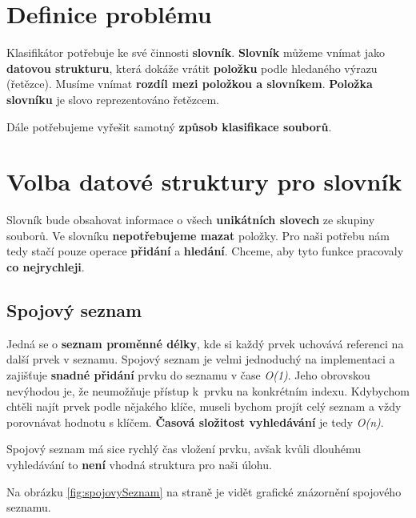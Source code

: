 \documentclass[12pt]{report}
\begin{document}
	\section{Definice problému}
	Klasifikátor potřebuje ke své činnosti \textbf{slovník}. \textbf{Slovník} můžeme vnímat jako \textbf{datovou strukturu}, která dokáže vrátit \textbf{položku} podle hledaného výrazu (řetězce). Musíme vnímat \textbf{rozdíl mezi položkou a slovníkem}. \textbf{Položka slovníku} je slovo  reprezentováno řetězcem.
	
	Dále potřebujeme vyřešit samotný \textbf{způsob klasifikace souborů}.
	
	\section{Volba datové struktury pro slovník}
	Slovník bude obsahovat informace o všech \textbf{unikátních slovech} ze skupiny souborů. Ve slovníku \textbf{nepotřebujeme mazat} položky. Pro naši potřebu nám tedy stačí pouze operace \textbf{přidání} a \textbf{hledání}. Chceme, aby tyto funkce pracovaly \textbf{co nejrychleji}.
	
		\subsection{Spojový seznam}
		Jedná se o \textbf{seznam proměnné délky}, kde si každý prvek uchovává referenci na další prvek v seznamu. Spojový seznam je velmi jednoduchý na implementaci a zajišťuje \textbf{snadné přidání} prvku do seznamu v čase \textit{O(1)}. Jeho obrovskou nevýhodou je, že neumožňuje přístup k~prvku na konkrétním indexu. Kdybychom chtěli najít prvek podle nějakého klíče, museli bychom projít celý seznam a vždy porovnávat hodnotu s klíčem. \textbf{Časová složitost vyhledávání} je tedy \textit{O(n)}. 
		
		Spojový seznam má sice rychlý čas vložení prvku, avšak kvůli dlouhému vyhledávání to \textbf{není} vhodná struktura pro naši úlohu. 
		
		Na obrázku \ref{fig:spojovySeznam} na straně \pageref{fig:spojovySeznam} je vidět grafické znázornění spojového seznamu.
					
\end{document}
